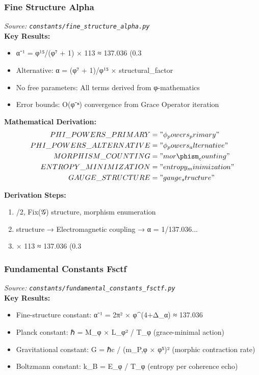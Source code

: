 \subsubsection{Fine Structure Alpha}
\textit{Source: \texttt{constants/fine_structure_alpha.py}}\\

\textbf{Key Results:}
\begin{itemize}
    \item α⁻¹ = φ¹⁵/(φ⁷ + 1) × 113 ≈ 137.036 (0.3%
    \item Alternative: α = (φ⁷ + 1)/φ¹⁵ × structural_factor
    \item No free parameters: All terms derived from φ-mathematics
    \item Error bounds: O(φ⁻ⁿ) convergence from Grace Operator iteration
\end{itemize}

\textbf{Mathematical Derivation:}
\begin{align}
    PHI\_POWERS\_PRIMARY &= "\phi_powers_primary" \\
    PHI\_POWERS\_ALTERNATIVE &= "\phi_powers_alternative" \\
    MORPHISM\_COUNTING &= "mor\phism_counting" \\
    ENTROPY\_MINIMIZATION &= "entropy_minimization" \\
    GAUGE\_STRUCTURE &= "gauge_structure" \\
\end{align}

\textbf{Derivation Steps:}
\begin{enumerate}
    \item /2, Fix(𝒢) structure, morphism enumeration
    \item structure → Electromagnetic coupling → α = 1/137.036...
    \item × 113 ≈ 137.036 (0.3%
\end{enumerate}

\subsubsection{Fundamental Constants Fsctf}
\textit{Source: \texttt{constants/fundamental_constants_fsctf.py}}\\

\textbf{Key Results:}
\begin{itemize}
    \item Fine-structure constant: α⁻¹ = 2π² × φ^(4+Δ_α) ≈ 137.036
    \item Planck constant: ℏ = M_φ × L_φ² / T_φ (grace-minimal action)
    \item Gravitational constant: G = ℏc / (m_P,φ × φ⁵)² (morphic contraction rate)
    \item Boltzmann constant: k_B = E_φ / T_φ (entropy per coherence echo)
\end{itemize}

